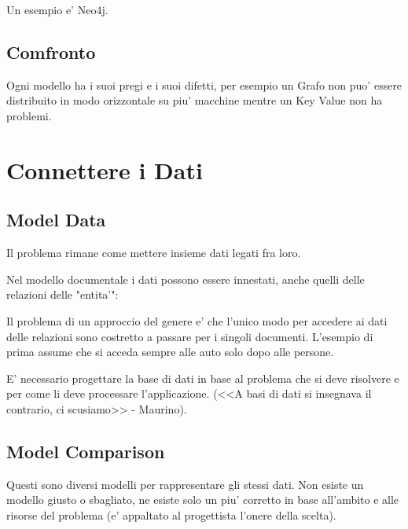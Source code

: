 Un esempio e' Neo4j.


\subsection{Comfronto}

Ogni modello ha i suoi pregi e i suoi difetti, per esempio un Grafo non puo' essere distribuito in modo orizzontale su piu' macchine mentre un Key Value non ha problemi.



\section{Connettere i Dati}

\subsection{Model Data}

Il problema rimane come mettere insieme dati legati fra loro.


Nel modello documentale i dati possono essere innestati, anche quelli delle relazioni delle "entita'":


Il problema di un approccio del genere e' che l'unico modo per accedere ai dati delle relazioni sono costretto a passare per i singoli documenti.
L'esempio di prima assume che si acceda sempre alle auto solo dopo alle persone.

E' necessario progettare la base di dati in base al problema che si deve risolvere e per come li deve processare l'applicazione. (<<A basi di dati si insegnava il contrario, ci scusiamo>> - Maurino).

\subsection{Model Comparison}

Questi sono diversi modelli per rappresentare gli stessi dati. Non esiste un modello giusto o sbagliato, ne esiste solo un piu' corretto in base all'ambito e alle risorse del problema (e' appaltato al progettista l'onere della scelta).

